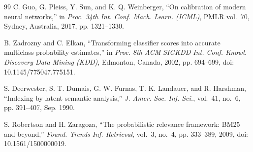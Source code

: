 \documentclass[conference]{IEEEtran}
\begin{document}
\begin{thebibliography}{99}
 C. Guo, G. Pleiss, Y. Sun, and K. Q. Weinberger, ``On
calibration of modern neural networks,'' in \emph{Proc. 34th Int. Conf. Mach.
Learn. (ICML)}, PMLR vol.~70, Sydney, Australia, 2017, pp. 1321--1330.

 B. Zadrozny and C. Elkan, ``Transforming classifier scores
into accurate multiclass probability estimates,'' in \emph{Proc. 8th ACM SIGKDD
Int. Conf. Knowl. Discovery Data Mining (KDD)}, Edmonton, Canada, 2002,
pp. 694--699, doi: 10.1145/775047.775151.

 S. Deerwester, S. T. Dumais, G. W. Furnas, T. K.
Landauer, and R. Harshman, ``Indexing by latent semantic analysis,'' \emph{J.
Amer. Soc. Inf. Sci.}, vol.~41, no.~6, pp. 391--407, Sep. 1990.

 S. Robertson and H. Zaragoza, ``The probabilistic
relevance framework: BM25 and beyond,'' \emph{Found. Trends Inf. Retrieval},
vol.~3, no.~4, pp. 333--389, 2009, doi: 10.1561/1500000019.
\end{thebibliography}
\end{document}

